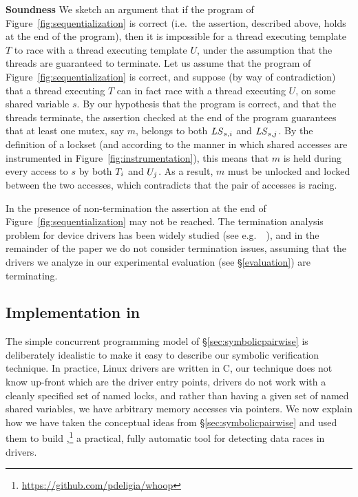 \noindent\textbf{Soundness }
%
We sketch an argument that if the program of Figure~\ref{fig:sequentialization} is correct (i.e.\ the assertion, described above, holds at the end of the program), then it is impossible for a thread executing template $T$ to race with a thread executing template $U$, under the assumption that the threads are guaranteed to terminate. Let us assume that the program of Figure~\ref{fig:sequentialization} is correct, and suppose (by way of contradiction) that a thread executing $T$ can in fact race with a thread executing $U$, on some shared variable $s$.  By our hypothesis that the program is correct, and that the threads terminate, the assertion checked at the end of the program guarantees that at least one mutex, say $m$, belongs to both $\mathit{LS}_{s,i}$ and $\mathit{LS}_{s,j}$.  By the definition of a lockset (and according to the manner in which shared accesses are instrumented in Figure~\ref{fig:instrumentation}), this means that $m$ is held during every access to $s$ by both $T_{i}$ and $U_{j}$. As a result, $m$ must be unlocked and locked between the two accesses, which contradicts that the pair of accesses is racing.

In the presence of non-termination the assertion at the end of Figure~\ref{fig:sequentialization} may not be reached.  The termination analysis problem for device drivers has been widely studied (see e.g.\ ~\cite{cook2006termination}), and in the remainder of the paper we do not consider termination issues, assuming that the drivers we analyze in our experimental evaluation (see \S\ref{evaluation}) are terminating.

\subsection{Implementation in \whoop}
\label{sec:implementation}

The simple concurrent programming model of \S\ref{sec:symbolicpairwise} is deliberately idealistic to make it easy to describe our symbolic verification technique. In practice, Linux drivers are written in C, our technique does not know up-front which are the driver entry points, drivers do not work with a cleanly specified set of named locks, and rather than having a given set of named shared variables, we have arbitrary memory accesses via pointers. We now explain how we have taken the conceptual ideas from \S\ref{sec:symbolicpairwise} and used them to build \whoop,\footnote{\url{https://github.com/pdeligia/whoop}} a practical, fully automatic tool for detecting data races in drivers.

